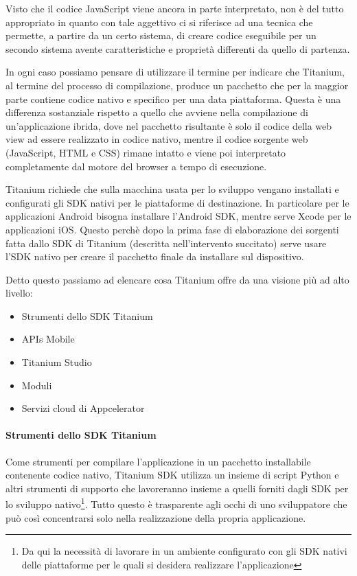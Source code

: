 			Visto che il codice JavaScript viene ancora in parte interpretato, 
			\crosscomp{} non è del tutto appropriato in quanto con tale 
			aggettivo ci si riferisce ad una tecnica che permette, a partire da 
			un certo sistema, di creare codice eseguibile per un secondo sistema 
			avente caratteristiche e proprietà differenti da quello di 
			partenza\citep{Web:Wiki.cross-compiling}.
			
			In ogni caso possiamo pensare di utilizzare il termine 
			\crosscomp{} per indicare che Titanium, al termine del processo di 
			compilazione, produce un pacchetto che per la 
			maggior parte contiene codice nativo e specifico per una data 
			piattaforma. Questa è una differenza sostanziale rispetto a quello 
			che avviene nella compilazione di un'applicazione ibrida, dove nel 
			pacchetto risultante è solo il codice della web view ad essere 
			realizzato in codice nativo, mentre il codice sorgente web 
			(JavaScript, HTML e CSS) rimane intatto e viene poi interpretato 
			completamente dal motore del browser a tempo di esecuzione.
			
			Titanium richiede che sulla macchina usata per lo sviluppo vengano 
			installati e configurati gli SDK nativi per le piattaforme di 
			destinazione. In particolare per le applicazioni Android bisogna 
			installare l'Android SDK, mentre serve Xcode per le applicazioni 
			iOS. Questo perchè dopo la prima fase di elaborazione dei sorgenti 
			fatta dallo SDK di Titanium (descritta nell'intervento succitato) 
			serve usare l'SDK nativo per creare il pacchetto finale da 
			installare sul dispositivo.
			
			\noindent Detto questo passiamo ad elencare cosa Titanium offre da 
			una visione più ad alto livello\citep[Cap.2 - Titanium 
			Mobile Overview]{Book:Ti}:
			\begin{itemize}
				\item Strumenti dello SDK Titanium
				\item APIs Mobile
				\item Titanium Studio
				\item Moduli
				\item Servizi cloud di Appcelerator
			\end{itemize}
	
			\paragraph{Strumenti dello SDK Titanium}
				Come strumenti per compilare l'applicazione in un pacchetto 
				installabile contenente codice nativo, Titanium SDK utilizza un 
				insieme di script Python e altri strumenti di supporto che 
				lavoreranno insieme a quelli forniti dagli SDK per lo sviluppo 
				nativo\footnote{Da qui la necessità di lavorare in un ambiente 
				configurato con gli SDK nativi delle piattaforme per le quali si 
				desidera realizzare l'applicazione}. Tutto questo è trasparente 
				agli occhi di uno sviluppatore che può così concentrarsi solo 
				nella realizzazione della propria applicazione.
				
